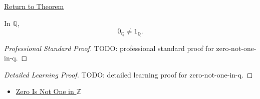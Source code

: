 \newpage
{}
\label{prf:zero-not-one-in-q}

\begin{remark*}[Return]
\hyperref[thm:zero-not-one-in-q]{Return to Theorem}
\end{remark*}

\begin{theorem*}
In $\mathbb{Q}$,
\[
0_{\mathbb{Q}}\ne 1_{\mathbb{Q}}.
\]
\end{theorem*}

\begin{proof}[Professional Standard Proof]
\LRAProofBodyStart
TODO: professional standard proof for zero-not-one-in-q.
\end{proof}

\begin{proof}[Detailed Learning Proof]
\LRAProofBodyStart
TODO: detailed learning proof for zero-not-one-in-q.
\end{proof}

\begin{remark*}
\end{remark*}

\begin{dependencies}
\begin{itemize}
  \item \hyperref[thm:zero-not-one-in-z]{Zero Is Not One in $\mathbb{Z}$}
\end{itemize}
\end{dependencies}

\clearpage
